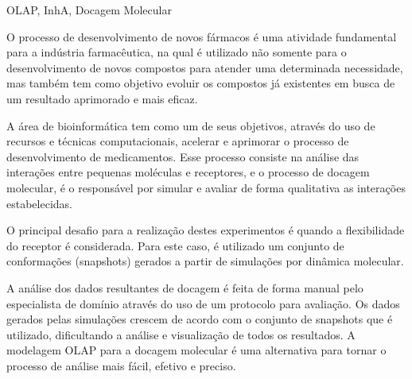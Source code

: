\documentclass[portuguese,twoside]{pucrs-ppgcc}
\begin{document}
\begin{resumo}{OLAP, InhA, Docagem Molecular}

O processo de desenvolvimento de novos fármacos é uma atividade fundamental para a indústria farmacêutica, na qual é utilizado não somente para o desenvolvimento de novos compostos para atender uma determinada necessidade, mas também tem como objetivo evoluir os compostos já existentes em busca de um resultado aprimorado e mais eficaz. 

A área de bioinformática tem como um de seus objetivos, através do uso de recursos e técnicas computacionais, acelerar e aprimorar o processo de desenvolvimento de medicamentos. Esse processo consiste na análise das interações entre pequenas moléculas e receptores, e o processo de docagem molecular, é o responsável por simular e avaliar de forma qualitativa as interações estabelecidas.  

O principal desafio para a realização destes experimentos é quando a flexibilidade do receptor é considerada. Para este caso, é utilizado um conjunto de conformações (snapshots) gerados a partir de simulações por dinâmica molecular.

A análise dos dados resultantes de docagem é feita de forma manual pelo especialista de domínio através do uso de um protocolo para avaliação. Os dados gerados pelas simulações crescem de acordo com o conjunto de snapshots que é utilizado, dificultando a análise e visualização de todos os resultados. A modelagem OLAP para a docagem molecular é uma alternativa para tornar o processo de análise mais fácil, efetivo e preciso.

\end{resumo}
\end{document}
